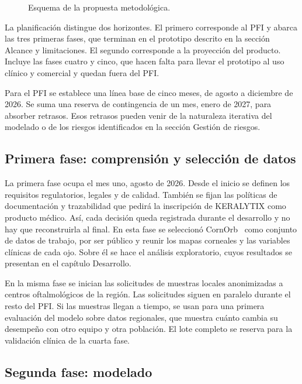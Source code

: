     \begin{figure}[H] \centering
        
        \caption{Esquema de la propuesta metodológica.}
        \label{fig:esquema_metodologia}
    \end{figure}

    La planificación distingue dos horizontes. El primero corresponde al PFI y abarca las tres primeras fases, que terminan en el prototipo descrito en la sección Alcance y limitaciones. El segundo corresponde a la proyección del producto. Incluye las fases cuatro y cinco, que hacen falta para llevar el prototipo al uso clínico y comercial y quedan fuera del PFI.

    Para el PFI se establece una línea base de cinco meses, de agosto a diciembre de 2026. Se suma una reserva de contingencia de un mes, enero de 2027, para absorber retrasos. Esos retrasos pueden venir de la naturaleza iterativa del modelado o de los riesgos identificados en la sección Gestión de riesgos.

    \subsection*{Primera fase: comprensión y selección de datos}

        La primera fase ocupa el mes uno, agosto de 2026. Desde el inicio se definen los requisitos regulatorios, legales y de calidad. También se fijan las políticas de documentación y trazabilidad que pedirá la inscripción de KERALYTIX como producto médico. Así, cada decisión queda registrada durante el desarrollo y no hay que reconstruirla al final. En esta fase se seleccionó CornOrb~\cite{zenodo} como conjunto de datos de trabajo, por ser público y reunir los mapas corneales y las variables clínicas de cada ojo. Sobre él se hace el análisis exploratorio, cuyos resultados se presentan en el capítulo Desarrollo.

        En la misma fase se inician las solicitudes de muestras locales anonimizadas a centros oftalmológicos de la región. Las solicitudes siguen en paralelo durante el resto del PFI. Si las muestras llegan a tiempo, se usan para una primera evaluación del modelo sobre datos regionales, que muestra cuánto cambia su desempeño con otro equipo y otra población. El lote completo se reserva para la validación clínica de la cuarta fase.

    \subsection*{Segunda fase: modelado}

